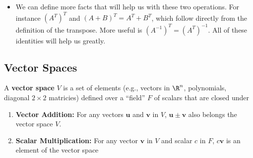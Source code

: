 \documentclass[11pt]{article}
\begin{document}
\begin{itemize}
\item We can define more facts that will help us with these two operations. For instance $(A^T)^T$ and $(A+B)^{T} = A^{T}+B^{T}$, which follow directly from the definition of the transpose. More useful is $\boxed{(A^{-1})^{T} = (A^{T})^{-1}}$. All of these identities will help us greatly.
\end{itemize}
\subsection{Vector Spaces}
\begin{ideabox}[Definition]
    A \textbf{vector space} $V$ is a set of elements (e.g., vectors in $\R^{n}$, polynomials, diagonal $2 \times 2$ matricies) defined over a ``field'' $F$ of scalars that are closed under
	\begin{enumerate}
		\item \textbf{Vector Addition: } For any vectors $\bm{u}$ and $\bm{v}$ in $V$, $\bm{u} \pm \bm{v}$ also belongs the vector space $V$.
		\item \textbf{Scalar Multiplication: }For any vector $\bm{v}$ in $V$ and scalar $c$ in $F$, $c\bm{v}$ is an element of the vector space
	\end{enumerate}
\end{ideabox}
\end{document}
